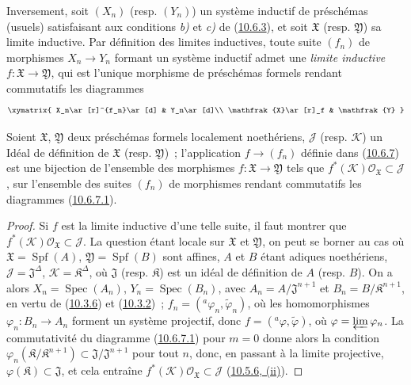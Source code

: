 \begin{env}[10.6.8]
\label{I.10.6.8-fr}
Inversement, soit $(X_n)$ (resp. $(Y_n)$) un système inductif de
préschémas (usuels) satisfaisant aux conditions \emph{b)} et \emph{c)} de
(\hyperref[I.10.6.3-fr]{10.6.3}), et soit $\mathfrak{X}$ (resp.
$\mathfrak{Y}$) sa limite inductive. Par définition des limites
inductives, toute suite $(f_n)$ de morphismes $X_n\to Y_n$ formant un
système inductif admet une \emph{limite inductive}
$f:\mathfrak{X}\to\mathfrak{Y}$, qui est l'unique morphisme de
préschémas formels rendant commutatifs les diagrammes
\[
  \xymatrix{
    X_n\ar[r]^{f_n}\ar[d] &
    Y_n\ar[d]\\
    \mathfrak{X}\ar[r]_f &
    \mathfrak{Y}
  }
\]
\end{env}

\begin{proposition}[10.6.9]
\label{I.10.6.9-fr}
Soient $\mathfrak{X}$, $\mathfrak{Y}$ deux préschémas formels
localement noethériens, $\mathscr{J}$ \textup{(resp. $\mathscr{K}$)} un Idéal
de définition de $\mathfrak{X}$ \textup{(resp. $\mathfrak{Y}$)}~;
l'application $f\to(f_n)$ définie dans
\textup{(\hyperref[I.10.6.7-fr]{10.6.7})} est une bijection de l'ensemble des
morphismes $f:\mathfrak{X}\to\mathfrak{Y}$ tels que
$f^*(\mathscr{K})\mathscr{O}_{\mathfrak{X}}\subset\mathscr{J}$, sur
l'ensemble des suites $(f_n)$ de morphismes rendant commutatifs les
diagrammes \textup{(\hyperref[I.10.6.7.1-fr]{10.6.7.1})}.
\end{proposition}

\begin{proof}
Si $f$ est la limite inductive d'une telle suite, il faut montrer que
$f^*(\mathscr{K})\mathscr{O}_{\mathfrak{X}}\subset\mathscr{J}$. La
question étant locale sur $\mathfrak{X}$ et $\mathfrak{Y}$, on peut se
borner au cas où $\mathfrak{X}=\operatorname{Spf}(A)$,
$\mathfrak{Y}=\operatorname{Spf}(B)$ sont affines, $A$ et $B$ étant
adiques noethériens,
$\mathscr{J}=\mathfrak{J}^\Delta$,
$\mathscr{K}=\mathfrak{K}^\Delta$, où $\mathfrak{J}$ (resp.
$\mathfrak{K}$) est un idéal de définition de $A$ (resp. $B$). On a
alors $X_n=\operatorname{Spec}(A_n)$,
$Y_n=\operatorname{Spec}(B_n)$, avec
$A_n=A/\mathfrak{J}^{n+1}$ et $B_n=B/\mathfrak{K}^{n+1}$, en vertu de
(\hyperref[I.10.3.6-fr]{10.3.6}) et
(\hyperref[I.10.3.2-fr]{10.3.2})~;
$f_n=({}^a\varphi_n,\widetilde{\varphi}_n)$, où les homomorphismes
$\varphi_n:B_n\to A_n$ forment un système projectif, donc
$f=({}^a\varphi,\widetilde{\varphi})$, où
$\varphi=\varprojlim\varphi_n$. La commutativité du diagramme
(\hyperref[I.10.6.7.1-fr]{10.6.7.1}) pour $m=0$ donne alors la
condition
$\varphi_n(\mathfrak{K}/\mathfrak{K}^{n+1})
\subset\mathfrak{J}/\mathfrak{J}^{n+1}$ pour tout $n$, donc, en
passant à la limite projective, $\varphi(\mathfrak{K})\subset
\mathfrak{J}$, et cela entraîne
$f^*(\mathscr{K})\mathscr{O}_{\mathfrak{X}}\subset\mathscr{J}$
(\hyperref[I.10.5.6-fr]{10.5.6, (ii)}).
\end{proof}


